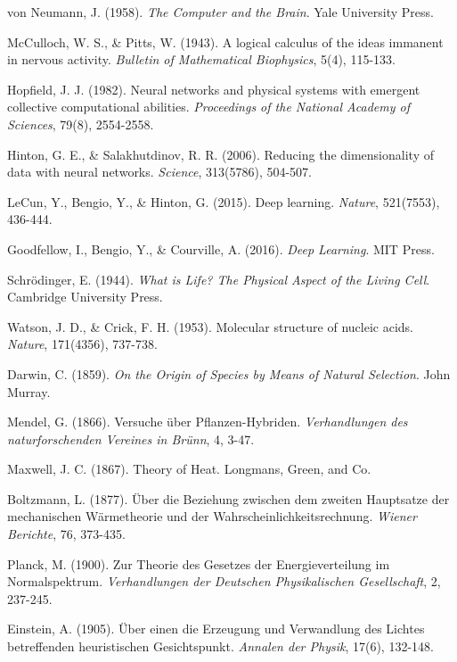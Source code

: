 \documentclass[12pt]{article}
\begin{document}
\begin{thebibliography}{99}
von Neumann, J. (1958). \textit{The Computer and the Brain}. Yale University Press.

McCulloch, W. S., \& Pitts, W. (1943). A logical calculus of the ideas immanent in nervous activity. \textit{Bulletin of Mathematical Biophysics}, 5(4), 115-133.

Hopfield, J. J. (1982). Neural networks and physical systems with emergent collective computational abilities. \textit{Proceedings of the National Academy of Sciences}, 79(8), 2554-2558.

Hinton, G. E., \& Salakhutdinov, R. R. (2006). Reducing the dimensionality of data with neural networks. \textit{Science}, 313(5786), 504-507.

LeCun, Y., Bengio, Y., \& Hinton, G. (2015). Deep learning. \textit{Nature}, 521(7553), 436-444.

Goodfellow, I., Bengio, Y., \& Courville, A. (2016). \textit{Deep Learning}. MIT Press.

Schrödinger, E. (1944). \textit{What is Life? The Physical Aspect of the Living Cell}. Cambridge University Press.

Watson, J. D., \& Crick, F. H. (1953). Molecular structure of nucleic acids. \textit{Nature}, 171(4356), 737-738.

Darwin, C. (1859). \textit{On the Origin of Species by Means of Natural Selection}. John Murray.

Mendel, G. (1866). Versuche über Pflanzen-Hybriden. \textit{Verhandlungen des naturforschenden Vereines in Brünn}, 4, 3-47.

Maxwell, J. C. (1867). Theory of Heat. Longmans, Green, and Co.

Boltzmann, L. (1877). Über die Beziehung zwischen dem zweiten Hauptsatze der mechanischen Wärmetheorie und der Wahrscheinlichkeitsrechnung. \textit{Wiener Berichte}, 76, 373-435.

Planck, M. (1900). Zur Theorie des Gesetzes der Energieverteilung im Normalspektrum. \textit{Verhandlungen der Deutschen Physikalischen Gesellschaft}, 2, 237-245.

Einstein, A. (1905). Über einen die Erzeugung und Verwandlung des Lichtes betreffenden heuristischen Gesichtspunkt. \textit{Annalen der Physik}, 17(6), 132-148.


\end{thebibliography}
\end{document}
